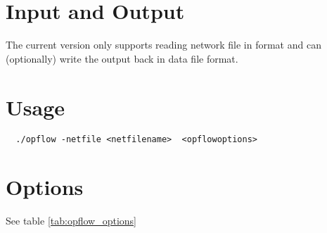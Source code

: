 \section{Input and Output}
The current \exago version only supports reading network file in \matpower format and can (optionally) write the output back in \matpower data file format.

\section{Usage}
\begin{lstlisting}
  ./opflow -netfile <netfilename>  <opflowoptions>
\end{lstlisting}

\section{Options}
See table \ref{tab:opflow_options}
